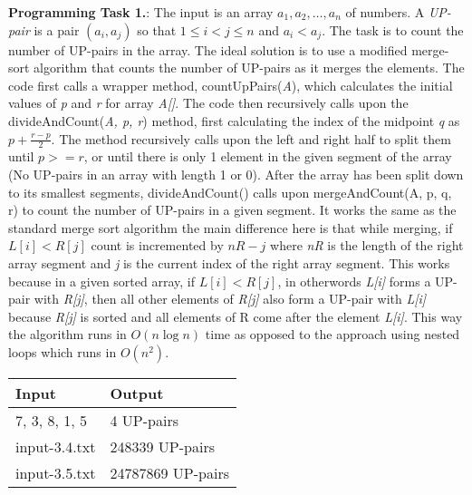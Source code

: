 \documentclass[11pt]{article}
\begin{document}
\newpage
\textbf{Programming Task 1.}: The input is an array $a_1, a_2, \ldots, a_n$ of numbers.  A  \emph{UP-pair} is a pair $(a_i, a_j)$  so that $1 \le i < j \le n$ and $a_i < a_j$. The task is to count the number of UP-pairs in the array. The ideal solution is to use a modified merge-sort algorithm that counts the number of UP-pairs as it merges the elements. The code first calls a wrapper method, countUpPairs(\textit{A}), which calculates the initial values of \textit{p} and \textit{r} for array \textit{A[]}. The code then recursively calls upon the divideAndCount(\textit{A, p, r}) method, first calculating the index of the midpoint \textit{q} as $p + \frac{r-p}{2}$. The method recursively calls upon the left and right half to split them until $p>=r$, or until there is only 1 element in the given segment of the array (No UP-pairs in an array with length 1 or 0). After the array has been split down to its smallest segments, divideAndCount() calls upon mergeAndCount(A, p, q, r) to count the number of UP-pairs in a given segment. It works the same as the standard merge sort algorithm the main difference here is that while merging, if $L[i] < R[j]$ count is incremented by $nR - j$ where \textit{nR} is the length of the right array segment and \textit{j} is the current index of the right array segment. This works because in a given sorted array, if $L[i] < R[j]$, in otherwords \textit{L[i]} forms a UP-pair with \textit{R[j]}, then all other elements of \textit{R[j]} also form a UP-pair with \textit{L[i]} because \textit{R[j]} is sorted and all elements of R come after the element \textit{L[i]}. This way the algorithm runs in $O(n\log n)$ time as opposed to the approach using nested loops which runs in $O(n^2)$.

\begin{center}
\begin{tabular}{|p{10em}|p{30em}|} 
\hline
\textbf{Input} & \textbf{Output} \\ 
\hline
7, 3, 8, 1, 5 & 4 UP-pairs \newline [1, 3, 5, 7, 8] \\ 
\hline 
input-3.4.txt & 248339 UP-pairs \newline [0, 1, 3, 4, 4, 5, 8, 9, \ldots, 984, 987, 990, 995, 999] \\ 
\hline 
input-3.5.txt & 24787869 UP-pairs \newline [2, 3, 3, 4, 4, 6, 8, 9, \ldots, 9996, 9997, 9998, 9999, 9999] \\ 
\hline
\end{tabular}
\end{center}
\end{document}
